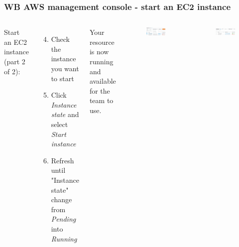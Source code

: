 \documentclass[aspectratio=169]{beamer} %
\begin{document}
\begin{frame}
	\frametitle{WB AWS management console - start an EC2 instance}
	
	\begin{columns}[c]
		
		
		Start an EC2 instance (part 2 of 2):
		
		\begin{enumerate}
			\setcounter{enumi}{3}
			\item Check the instance you want to start
			\item Click \textit{Instance state} and select \textit{Start instance}
			\item Refresh until "Instance state" change from \textit{Pending} into \textit{Running}
		\end{enumerate}
		
		Your resource is now running and available for the team to use.

		\begin{figure}
			\centering
			\includegraphics[width=1\textwidth]{./img/ec2-2.png}
		\end{figure}
		\begin{figure}
			\centering
			\includegraphics[width=1\textwidth]{./img/ec2-3.png}
		\end{figure}
		\vspace{.5cm}
		
	\end{columns}
\end{frame}
\end{document}
